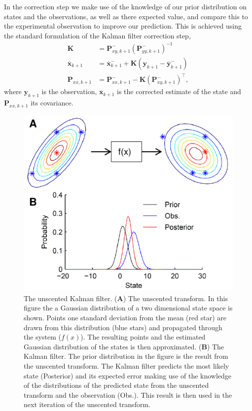 In the correction step we make use of the knowledge of our prior distribution on states and the observations, as well as there expected value, and compare this to the experimental observation to improve our prediction. This is achieved using the standard formulation of the Kalman filter correction step,
\begin{align}
\mathbf{K} &= \mathbf{P}_{xy,k+1}^{-}(\mathbf{P}_{yy,k+1}^{-})^{-1}\\
\overline{\mathbf{x}}_{k+1} &= \overline{\mathbf{x}}_{k+1}^{-} + \mathbf{K}(\mathbf{y}_{k+1}-\overline{\mathbf{y}}_{k+1}^{-})\\
\mathbf{P}_{xx,k+1} &= \mathbf{P}_{xx,k+1}^{-} - \mathbf{K}(\mathbf{P}_{xy,k+1}^{-})^{\top},
\end{align} where $\mathbf{y}_{k+1}$ is the observation, $\overline{\mathbf{x}}_{k+1}$ is the corrected estimate of the state and $\mathbf{P}_{xx,k+1}$ its covariance.

 \begin{figure}
 	\centering
 		\includegraphics{fig/UnscentedKalman.pdf}
 	\caption{The unscented Kalman filter. (\textbf{A}) The unscented transform. In this figure the a Gaussian distribution of a two dimensional state space is shown. Points one standard deviation  from the mean (red star) are drawn from this distribution (blue stars) and propagated through the system ($f(x)$). The resulting points and the estimated Gaussian distribution of the states is then approximated. (\textbf{B}) The Kalman filter. The prior distribution in the figure is the result from the unscented transform. The Kalman filter predicts the most likely state (Posterior) and its expected error making use of the knowledge of the distributions of the predicted state from the unscented transform and the observation (Obs.). This result is then used in the next iteration of the unscented transform.}
 	\label{fig: UKF}
 \end{figure}


